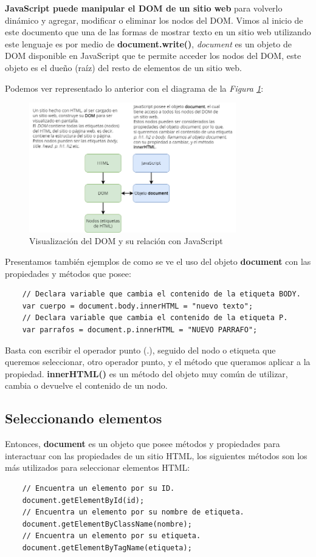 \textbf{JavaScript puede manipular el DOM de un sitio web} para volverlo dinámico y agregar, modificar o eliminar los nodos del DOM. Vimos al inicio de este documento que una de las formas de mostrar texto en un sitio web utilizando este lenguaje es por medio de \textbf{document.write()}, \textit{document} es un objeto de DOM disponible en JavaScript que te permite acceder los nodos del DOM, este objeto es el dueño (raíz) del resto de elementos de un sitio web.

Podemos ver representado lo anterior con el diagrama de la \textit{Figura \ref{fig: 6}}:
\begin{figure}[H]
    \caption{Visualización del DOM y su relación con JavaScript}
    \label{fig: 6}
    \begin{center}
        \includegraphics [width=9cm]{ss/dom_explicacion.png}
    \end{center}
\end{figure}

Presentamos también ejemplos de como se ve el uso del objeto \textbf{document} con las propiedades y métodos que posee:
\begin{lstlisting}
    // Declara variable que cambia el contenido de la etiqueta BODY.
    var cuerpo = document.body.innerHTML = "nuevo texto";
    // Declara variable que cambia el contenido de la etiqueta P.
    var parrafos = document.p.innerHTML = "NUEVO PARRAFO";
\end{lstlisting}

Basta con escribir el operador punto (.), seguido del nodo o etiqueta que queremos seleccionar, otro operador punto, y el método que queramos aplicar a la propiedad. \textbf{innerHTML()} es un método del objeto muy común de utilizar, cambia o devuelve el contenido de un nodo.


\subsection{Seleccionando elementos}
\hspace{0.55cm}Entonces, \textbf{document} es un objeto que posee métodos y propiedades para interactuar con las propiedades de un sitio HTML, los siguientes métodos son los más utilizados para seleccionar elementos HTML:
\begin{lstlisting}
    // Encuentra un elemento por su ID.
    document.getElementById(id);
    // Encuentra un elemento por su nombre de etiqueta.
    document.getElementByClassName(nombre);
    // Encuentra un elemento por su etiqueta.
    document.getElementByTagName(etiqueta);
\end{lstlisting}

